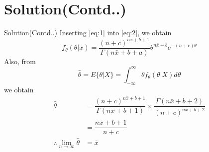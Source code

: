 \documentclass{beamer}
\begin{document}
\section{Solution(Contd..)}
\begin{frame}{Solution(Contd..)}
Inserting \eqref{eq:1} into \eqref{eq:2}, we obtain
\begin{equation}
    f_{\theta}(\theta|\bar{x})=  \dfrac{(n+c)^{n\bar{x}+b+1}}{\Gamma(n\bar{x}+b+a)}\theta^{n\bar{x}+b} e^{-(n+c)\theta}
\end{equation}
 Also, from
\begin{equation}
    \hat{\theta} = E\{\theta|X\} = \int_{-\infty}^{\infty} \theta f_{\theta}(\theta|X)d\theta
\end{equation}
we obtain
\begin{align}
    \hat{\theta}&= \dfrac{(n+c)^{n\bar{x}+b+1}}{\Gamma(n\bar{x}+b+1)} \times \dfrac{\Gamma(n\bar{x}+b+2)}{(n+c)^{n\bar{x}+b+2}}\\
    &= \dfrac{n\bar{x}+b+1}{n+c}\\
    \therefore \lim_{n \to \infty} \hat{\theta} &= \bar{x}
\end{align}
\end{frame}
\end{document}
